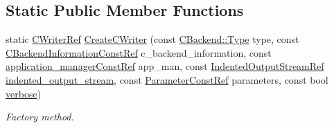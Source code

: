 \subsection*{Static Public Member Functions}
\begin{DoxyCompactItemize}
\item 
static \hyperlink{c__writer_8hpp_a4e9c4dfe17e35f981e27b6dd97f9632c}{C\+Writer\+Ref} \hyperlink{classCWriter_ac5dc8feea1af06fe1d58f10fbe91eaf2}{Create\+C\+Writer} (const \hyperlink{classCBackend_abadfd9ef309ba4d12e648fe2e3fff08b}{C\+Backend\+::\+Type} type, const \hyperlink{c__backend__information_8hpp_affe03f2ae5a23aa0efcd9d958c85280d}{C\+Backend\+Information\+Const\+Ref} c\+\_\+backend\+\_\+information, const \hyperlink{application__manager_8hpp_abb985163a2a3fb747f6f03b1eaadbb44}{application\+\_\+manager\+Const\+Ref} app\+\_\+man, const \hyperlink{indented__output__stream_8hpp_ab32278e11151ef292759c88e99b77feb}{Indented\+Output\+Stream\+Ref} \hyperlink{classCWriter_ac6d016436e065c31dd5152a7cc30e507}{indented\+\_\+output\+\_\+stream}, const \hyperlink{Parameter_8hpp_a37841774a6fcb479b597fdf8955eb4ea}{Parameter\+Const\+Ref} parameters, const bool \hyperlink{classCWriter_a8d5b6fe4a045d7e9ca997a566274cdb5}{verbose})
\begin{DoxyCompactList}\small\item\em Factory method. \end{DoxyCompactList}\end{DoxyCompactItemize}
